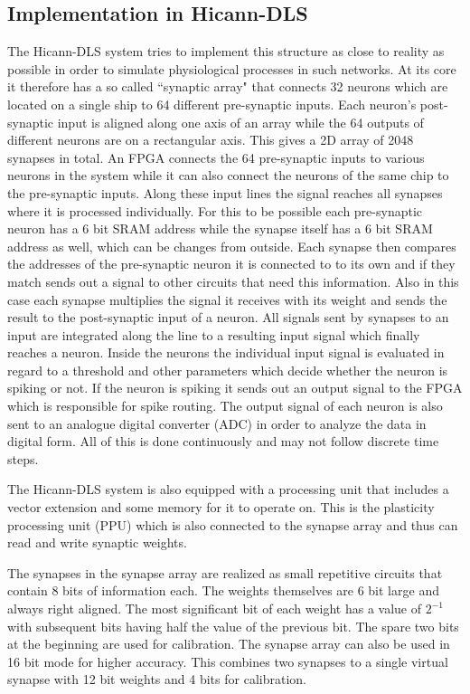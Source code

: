 \subsection{Implementation in Hicann-DLS}
The Hicann-DLS system tries to implement this structure as close to reality as possible in order to simulate physiological processes in such networks.
At its core it therefore has a so called ``synaptic array" that connects 32 neurons which are located on a single ship to 64 different pre-synaptic inputs.
Each neuron's post-synaptic input is aligned along one axis of an array while the 64 outputs of different neurons are on a rectangular axis.
This gives a 2D array of 2048 synapses in total.
An FPGA connects the 64 pre-synaptic inputs to various neurons in the system while it can also connect the neurons of the same chip to the pre-synaptic inputs.
Along these input lines the signal reaches all synapses where it is processed individually.
For this to be possible each pre-synaptic neuron has a 6 bit SRAM address while the synapse itself has a 6 bit SRAM address as well, which can be changes from outside.
Each synapse then compares the addresses of the pre-synaptic neuron it is connected to to its own and if they match sends out a signal to other circuits that need this information.
Also in this case each synapse multiplies the signal it receives with its weight and sends the result to the post-synaptic input of a neuron.
All signals sent by synapses to an input are integrated along the line to a resulting input signal which finally reaches a neuron.
Inside the neurons the individual input signal is evaluated in regard to a threshold and other parameters which decide whether the neuron is spiking or not.
If the neuron is spiking it sends out an output signal to the FPGA which is responsible for spike routing.
The output signal of each neuron is also sent to an analogue digital converter (ADC) in order to analyze the data in digital form.
All of this is done continuously and may not follow discrete time steps.

The Hicann-DLS system is also equipped with a processing unit that includes a vector extension and some memory for it to operate on.
This is the plasticity processing unit (PPU) which is also connected to the synapse array and thus can read and write synaptic weights.

The synapses in the synapse array are realized as small repetitive circuits that contain 8 bits of information each.
The weights themselves are 6 bit large and always right aligned.
The most significant bit of each weight has a value of $2^{-1}$ with subsequent bits having half the value of the previous bit.
The spare two bits at the beginning are used for calibration.
The synapse array can also be used in 16 bit mode for higher accuracy.
This combines two synapses to a single virtual synapse with 12 bit weights and 4 bits for calibration.

